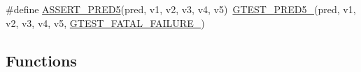 \begin{DoxyCompactItemize}
\item 
\#define \mbox{\hyperlink{_obj__test_2lib_2googletest-master_2googletest_2include_2gtest_2gtest__pred__impl_8h_af8e510af2b4a14d90eef66ace17d1c30}{A\+S\+S\+E\+R\+T\+\_\+\+P\+R\+E\+D5}}(pred,  v1,  v2,  v3,  v4,  v5)~\mbox{\hyperlink{_obj__test_2lib_2googletest-release-1_88_81_2googletest_2include_2gtest_2gtest__pred__impl_8h_a2c42692f7d910dc2fe57869883190e6c}{G\+T\+E\+S\+T\+\_\+\+P\+R\+E\+D5\+\_\+}}(pred, v1, v2, v3, v4, v5, \mbox{\hyperlink{_obj__test_2lib_2googletest-release-1_88_81_2googletest_2include_2gtest_2internal_2gtest-internal_8h_a0f9a4c3ea82cc7bf4478eaffdc168358}{G\+T\+E\+S\+T\+\_\+\+F\+A\+T\+A\+L\+\_\+\+F\+A\+I\+L\+U\+R\+E\+\_\+}})
\end{DoxyCompactItemize}
\subsection*{Functions}
